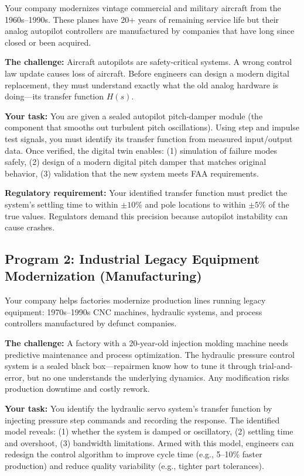 \documentclass[11pt,letterpaper]{article}
\begin{document}
Your company modernizes vintage commercial and military aircraft from the 1960s--1990s. These planes have 20+ years of remaining service life but their analog autopilot controllers are manufactured by companies that have long since closed or been acquired.

\textbf{The challenge:} Aircraft autopilots are safety-critical systems. A wrong control law update causes loss of aircraft. Before engineers can design a modern digital replacement, they must understand exactly what the old analog hardware is doing—its transfer function $H(s)$.

\textbf{Your task:} You are given a sealed autopilot pitch-damper module (the component that smooths out turbulent pitch oscillations). Using step and impulse test signals, you must identify its transfer function from measured input/output data. Once verified, the digital twin enables: (1) simulation of failure modes safely, (2) design of a modern digital pitch damper that matches original behavior, (3) validation that the new system meets FAA requirements.

\textbf{Regulatory requirement:} Your identified transfer function must predict the system's settling time to within $\pm 10\%$ and pole locations to within $\pm 5\%$ of the true values. Regulators demand this precision because autopilot instability can cause crashes.

\subsection{Program 2: Industrial Legacy Equipment Modernization (Manufacturing)}

Your company helps factories modernize production lines running legacy equipment: 1970s--1990s CNC machines, hydraulic systems, and process controllers manufactured by defunct companies.

\textbf{The challenge:} A factory with a 20-year-old injection molding machine needs predictive maintenance and process optimization. The hydraulic pressure control system is a sealed black box—repairmen know how to tune it through trial-and-error, but no one understands the underlying dynamics. Any modification risks production downtime and costly rework.

\textbf{Your task:} You identify the hydraulic servo system's transfer function by injecting pressure step commands and recording the response. The identified model reveals: (1) whether the system is damped or oscillatory, (2) settling time and overshoot, (3) bandwidth limitations. Armed with this model, engineers can redesign the control algorithm to improve cycle time (e.g., 5--10\% faster production) and reduce quality variability (e.g., tighter part tolerances).
\end{document}
